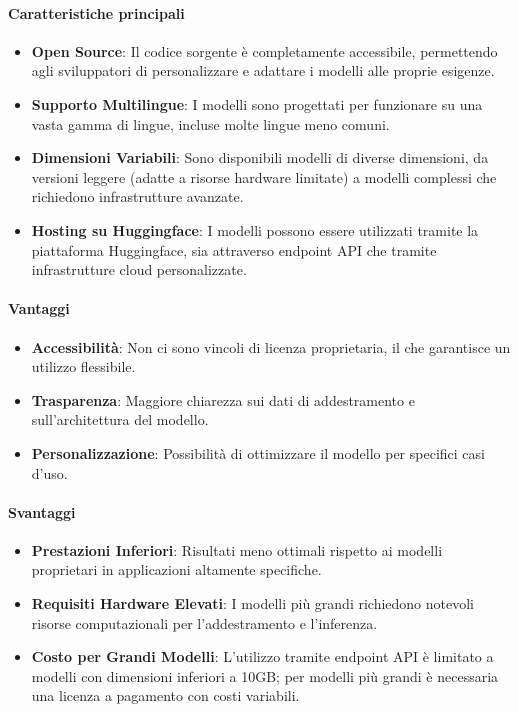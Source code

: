 \documentclass{article}
\begin{document}
\paragraph*{Caratteristiche principali}
\begin{itemize}
    \item \textbf{Open Source}: Il codice sorgente è completamente accessibile, permettendo agli sviluppatori di personalizzare e adattare i modelli alle proprie esigenze.
    \item \textbf{Supporto Multilingue}: I modelli sono progettati per funzionare su una vasta gamma di lingue, incluse molte lingue meno comuni.
    \item \textbf{Dimensioni Variabili}: Sono disponibili modelli di diverse dimensioni, da versioni leggere (adatte a risorse hardware limitate) a modelli complessi che richiedono infrastrutture avanzate.
    \item \textbf{Hosting su Huggingface}: I modelli possono essere utilizzati tramite la piattaforma Huggingface, sia attraverso endpoint API che tramite infrastrutture cloud personalizzate.
\end{itemize}

\paragraph*{Vantaggi}
\begin{itemize}
    \item \textbf{Accessibilità}: Non ci sono vincoli di licenza proprietaria, il che garantisce un utilizzo flessibile.
    \item \textbf{Trasparenza}: Maggiore chiarezza sui dati di addestramento e sull'architettura del modello.
    \item \textbf{Personalizzazione}: Possibilità di ottimizzare il modello per specifici casi d'uso.
\end{itemize}

\paragraph*{Svantaggi}
\begin{itemize}
    \item \textbf{Prestazioni Inferiori}: Risultati meno ottimali rispetto ai modelli proprietari in applicazioni altamente specifiche.
    \item \textbf{Requisiti Hardware Elevati}: I modelli più grandi richiedono notevoli risorse computazionali per l'addestramento e l'inferenza.
    \item \textbf{Costo per Grandi Modelli}: L'utilizzo tramite endpoint API è limitato a modelli con dimensioni inferiori a 10GB; per modelli più grandi è necessaria una licenza a pagamento con costi variabili.
\end{itemize}
\end{document}
